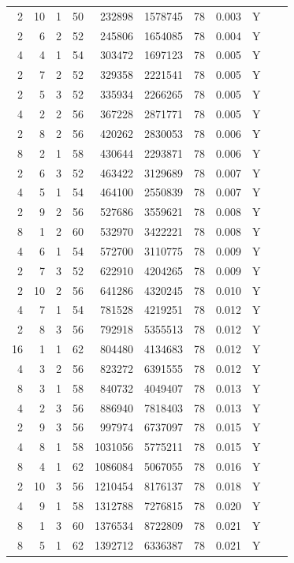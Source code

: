 \begin{table}[t]
\begin{tabularx}{\linewidth}{rrrrrrrrrrr}
2 & 10 & 1 & 50 & 232898 & 1578745 & 78 & 0.003 & Y \\
2 & 6 & 2 & 52 & 245806 & 1654085 & 78 & 0.004 & Y \\
4 & 4 & 1 & 54 & 303472 & 1697123 & 78 & 0.005 & Y \\
2 & 7 & 2 & 52 & 329358 & 2221541 & 78 & 0.005 & Y \\
2 & 5 & 3 & 52 & 335934 & 2266265 & 78 & 0.005 & Y \\
4 & 2 & 2 & 56 & 367228 & 2871771 & 78 & 0.005 & Y \\
2 & 8 & 2 & 56 & 420262 & 2830053 & 78 & 0.006 & Y \\
8 & 2 & 1 & 58 & 430644 & 2293871 & 78 & 0.006 & Y \\
2 & 6 & 3 & 52 & 463422 & 3129689 & 78 & 0.007 & Y \\
4 & 5 & 1 & 54 & 464100 & 2550839 & 78 & 0.007 & Y \\
2 & 9 & 2 & 56 & 527686 & 3559621 & 78 & 0.008 & Y \\
8 & 1 & 2 & 60 & 532970 & 3422221 & 78 & 0.008 & Y \\
4 & 6 & 1 & 54 & 572700 & 3110775 & 78 & 0.009 & Y \\
2 & 7 & 3 & 52 & 622910 & 4204265 & 78 & 0.009 & Y \\
2 & 10 & 2 & 56 & 641286 & 4320245 & 78 & 0.010 & Y \\
4 & 7 & 1 & 54 & 781528 & 4219251 & 78 & 0.012 & Y \\
2 & 8 & 3 & 56 & 792918 & 5355513 & 78 & 0.012 & Y \\
16 & 1 & 1 & 62 & 804480 & 4134683 & 78 & 0.012 & Y \\
4 & 3 & 2 & 56 & 823272 & 6391555 & 78 & 0.012 & Y \\
8 & 3 & 1 & 58 & 840732 & 4049407 & 78 & 0.013 & Y \\
4 & 2 & 3 & 56 & 886940 & 7818403 & 78 & 0.013 & Y \\
2 & 9 & 3 & 56 & 997974 & 6737097 & 78 & 0.015 & Y \\
4 & 8 & 1 & 58 & 1031056 & 5775211 & 78 & 0.015 & Y \\
8 & 4 & 1 & 62 & 1086084 & 5067055 & 78 & 0.016 & Y \\
2 & 10 & 3 & 56 & 1210454 & 8176137 & 78 & 0.018 & Y \\
4 & 9 & 1 & 58 & 1312788 & 7276815 & 78 & 0.020 & Y \\
8 & 1 & 3 & 60 & 1376534 & 8722809 & 78 & 0.021 & Y \\
8 & 5 & 1 & 62 & 1392712 & 6336387 & 78 & 0.021 & Y \\

\end{tabularx}
\end{table}
